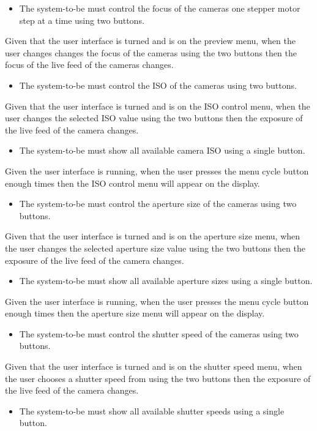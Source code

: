 \begin{itemize}
	\item The system-to-be must control the focus of the cameras one stepper motor step at a time using two buttons.
\end{itemize}
Given that the user interface is turned and is on the preview menu, when the user changes changes the focus of the cameras using the two buttons then the focus of the live feed of the cameras changes.
\begin{itemize}
	\item The system-to-be must control the ISO of the cameras using two buttons.
\end{itemize}
Given that the user interface is turned and is on the ISO control menu, when the user changes the selected ISO value using the two buttons then the exposure of the live feed of the camera changes.
\begin{itemize}
	\item The system-to-be must show all available camera ISO using a single button.
\end{itemize}
Given the user interface is running, when the user presses the menu cycle button enough times then the ISO control menu will appear on the display.
\begin{itemize}
	\item The system-to-be must control the aperture size of the cameras using two buttons.
\end{itemize}
Given that the user interface is turned and is on the aperture size menu, when the user changes the selected aperture size value using the two buttons then the exposure of the live feed of the camera changes.
\begin{itemize}
	\item The system-to-be must show all available aperture sizes using a single button.
\end{itemize}
Given the user interface is running, when the user presses the menu cycle button enough times then the aperture size menu will appear on the display.
\begin{itemize}
	\item The system-to-be must control the shutter speed of the cameras using two buttons.
\end{itemize}
Given that the user interface is turned and is on the shutter speed menu, when the user chooses a shutter speed from using the two buttons then the exposure of the live feed of the camera changes.
\begin{itemize}
	\item The system-to-be must show all available shutter speeds using a single button.
\end{itemize}
